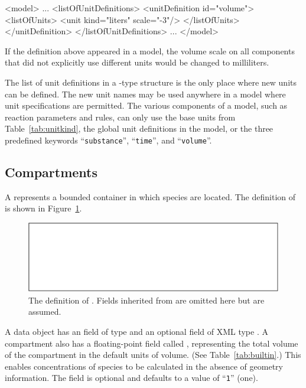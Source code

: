 \documentclass[10pt]{cekarticle}
\newcommand{\vref}[1]{\ref{#1}}
\begin{document}
\begin{example}
<model>
    ...
    <listOfUnitDefinitions>
        <unitDefinition id="volume">
            <listOfUnits>
                <unit kind="liters" scale="-3"/>
            </listOfUnits>
        </unitDefinition>
    </listOfUnitDefinitions>
    ...
</model>
\end{example}

If the definition above appeared in a model, the volume scale on all
components that did not explicitly use different units would be changed to
milliliters.

The list of unit definitions in a -type structure is the only
place where new units can be defined.  The new unit names may be used
anywhere in a model where unit specifications are permitted.  The various
components of a model, such as reaction parameters and rules, can only use
the base units from Table~\ref{tab:unitkind}, the global unit definitions
in the model, or the three predefined keywords ``\texttt{substance}'',
``\texttt{time}'', and ``\texttt{volume}''.

\subsection{Compartments}
\label{sec:compartments}

A  represents a bounded container in which
species are located.  The definition of  is
shown in Figure~\vref{fig:compartment}.

\begin{figure}[htb]
  \vspace*{8pt}
  \centering
  \includegraphics[scale = 0.68]{compartment}
  \caption{The definition of .
    Fields inherited from  are omitted here but are assumed.}
  \label{fig:compartment}
\end{figure}

A  data object has an  field of type
 and an optional  field of XML type
. A compartment also has a floating-point field
called , representing the total volume of the
compartment in the default units of volume. (See
Table~\vref{tab:builtin}.) This enables concentrations of species
to be calculated in the absence of geometry information. The
 field is optional and defaults to a value of
``\texttt{1}'' (one).
\end{document}
